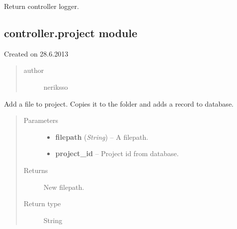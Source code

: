 \documentclass[letterpaper,10pt,english]{sphinxmanual}
\begin{document}

\begin{fulllineitems}
\label{controller:controller.handlers.logger}
Return controller logger.

\end{fulllineitems}



\subsection{controller.project module}
\label{controller:controller-project-module}\label{controller:module-controller.project}
Created on 28.6.2013
\begin{quote}\begin{description}
\item[{author}] \leavevmode
neriksso

\end{description}\end{quote}

\begin{fulllineitems}
\label{controller:controller.project.add_file_to_project}
Add a file to project. Copies it to the folder and adds a record to
database.
\begin{quote}\begin{description}
\item[{Parameters}] \leavevmode\begin{itemize}
\item {} 
\textbf{filepath} (\emph{String}) -- A filepath.

\item {} 
\textbf{project\_id} -- Project id from database.

\end{itemize}

\item[{Returns}] \leavevmode
New filepath.

\item[{Return type}] \leavevmode
String

\end{description}\end{quote}

\end{fulllineitems}
\end{document}
